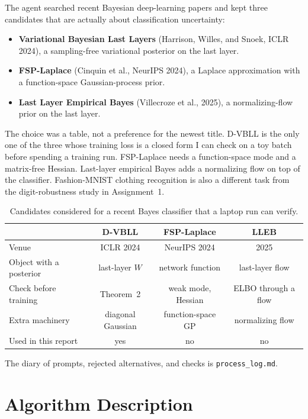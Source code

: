 \documentclass[11pt,a4paper]{article}
\begin{document}
The agent searched recent Bayesian deep-learning papers and kept three candidates that are actually about classification uncertainty:
\begin{itemize}
  \item \textbf{Variational Bayesian Last Layers} (Harrison, Willes, and Snoek, ICLR 2024), a sampling-free variational posterior on the last layer.
  \item \textbf{FSP-Laplace} (Cinquin et al., NeurIPS 2024), a Laplace approximation with a function-space Gaussian-process prior.
  \item \textbf{Last Layer Empirical Bayes} (Villecroze et al., 2025), a normalizing-flow prior on the last layer.
\end{itemize}
The choice was a table, not a preference for the newest title.
D-VBLL is the only one of the three whose training loss is a closed form I can check on a toy batch before spending a training run.
FSP-Laplace needs a function-space mode and a matrix-free Hessian.
Last-layer empirical Bayes adds a normalizing flow on top of the classifier.
Fashion-MNIST clothing recognition is also a different task from the digit-robustness study in Assignment~1.

\begin{table}[H]
\centering
\caption{Candidates considered for a recent Bayes classifier that a laptop run can verify.}
\label{tab:choice}
\small
\begin{tabular}{lccc}
\toprule
 & D-VBLL & FSP-Laplace & LLEB \\
\midrule
Venue & ICLR 2024 & NeurIPS 2024 & 2025 \\
Object with a posterior & last-layer $W$ & network function & last-layer flow \\
Check before training & Theorem~2 & weak mode, Hessian & ELBO through a flow \\
Extra machinery & diagonal Gaussian & function-space GP & normalizing flow \\
Used in this report & yes & no & no \\
\bottomrule
\end{tabular}
\end{table}
The diary of prompts, rejected alternatives, and checks is \texttt{process\_log.md}.

\section{Algorithm Description}
\label{sec:algo}
\end{document}
